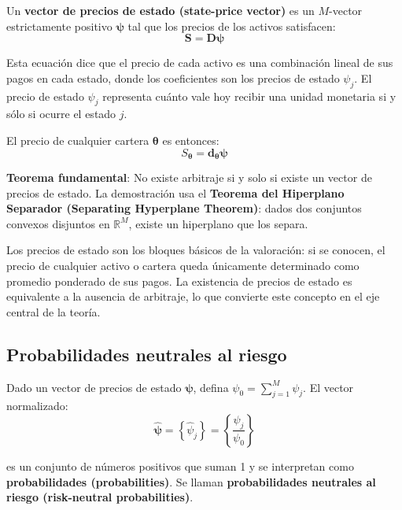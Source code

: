 \documentclass[12pt]{article}
\begin{document}
Un \textbf{vector de precios de estado (state-price vector)} es un $M$-vector estrictamente positivo $\boldsymbol{\psi}$ tal que los precios de los activos satisfacen:
\begin{equation}
    \mathbf{S} = \mathbf{D}\boldsymbol{\psi}
\end{equation}

\begin{intuicionmat}
Esta ecuaci\'on dice que el precio de cada activo es una combinaci\'on lineal de sus pagos en cada estado, donde los coeficientes son los precios de estado $\psi_j$. El precio de estado $\psi_j$ representa cu\'anto vale hoy recibir una unidad monetaria si y s\'olo si ocurre el estado $j$.
\end{intuicionmat}

El precio de cualquier cartera $\boldsymbol{\theta}$ es entonces:
\begin{equation}
    S_{\boldsymbol{\theta}} = \mathbf{d}_{\boldsymbol{\theta}} \boldsymbol{\psi}
\end{equation}

\textbf{Teorema fundamental}: No existe arbitraje si y solo si existe un vector de precios de estado. La demostraci\'on usa el \textbf{Teorema del Hiperplano Separador (Separating Hyperplane Theorem)}: dados dos conjuntos convexos disjuntos en $\mathbb{R}^M$, existe un hiperplano que los separa.

\begin{intuicion}
Los precios de estado son los bloques b\'asicos de la valoraci\'on: si se conocen, el precio de cualquier activo o cartera queda \'unicamente determinado como promedio ponderado de sus pagos. La existencia de precios de estado es equivalente a la ausencia de arbitraje, lo que convierte este concepto en el eje central de la teor\'ia.
\end{intuicion}

\subsection{Probabilidades neutrales al riesgo}

Dado un vector de precios de estado $\boldsymbol{\psi}$, defina $\psi_0 = \sum_{j=1}^{M} \psi_j$. El vector normalizado:
\begin{equation}
    \hat{\boldsymbol{\psi}} = \left\{\hat{\psi}_j\right\} = \left\{\frac{\psi_j}{\psi_0}\right\}
\end{equation}

es un conjunto de n\'umeros positivos que suman 1 y se interpretan como \textbf{probabilidades (probabilities)}. Se llaman \textbf{probabilidades neutrales al riesgo (risk-neutral probabilities)}.
\end{document}
